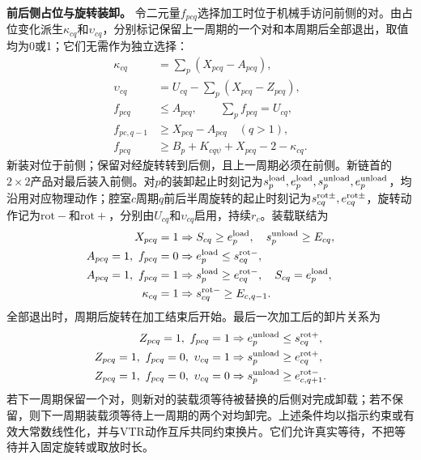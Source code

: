 \documentclass[final,5p,times,twocolumn]{elsarticle}
\begin{document}
\noindent\textbf{前后侧占位与旋转装卸。}
令二元量$f_{pcq}$选择加工时位于机械手访问前侧的对。由占位变化派生$\kappa_{cq}$和$\upsilon_{cq}$，分别标记保留上一周期的一个对和本周期后全部退出，取值均为0或1；它们无需作为独立选择：
\begin{equation}
\begin{aligned}
\kappa_{cq}&=\sum_p(X_{pcq}-A_{pcq}),\\
\upsilon_{cq}&=U_{cq}-\sum_p(X_{pcq}-Z_{pcq}),\\
f_{pcq}&\le A_{pcq},\qquad\sum_pf_{pcq}=U_{cq},\\
f_{pc,q-1}&\ge X_{pcq}-A_{pcq}\quad(q>1),\\
f_{pcq}&\ge B_p+K_{cq\psi}+X_{pcq}-2-\kappa_{cq}.
\end{aligned}
\label{eq:cycle-side-cn}
\end{equation}
新装对位于前侧；保留对经旋转转到后侧，且上一周期必须在前侧。新链首的$2\times2$产品对最后装入前侧。对$p$的装卸起止时刻记为$s_p^{\rm load},e_p^{\rm load},s_p^{\rm unload},e_p^{\rm unload}$，均沿用对应物理动作；腔室$c$周期$q$前后半周旋转的起止时刻记为$s_{cq}^{\rm rot\pm},e_{cq}^{\rm rot\pm}$，旋转动作记为$\mathrm{rot-}$和$\mathrm{rot+}$，分别由$U_{cq}$和$\upsilon_{cq}$启用，持续$r_c$。装载联结为
\begin{equation}
\begin{aligned}
X_{pcq}=1&\Rightarrow S_{cq}\ge e^{\rm load}_p,\quad
s^{\rm unload}_p\ge E_{cq},\\
A_{pcq}=1,\ f_{pcq}=0&\Rightarrow e^{\rm load}_p\le s^{\rm rot-}_{cq},\\
A_{pcq}=1,\ f_{pcq}=1&\Rightarrow s^{\rm load}_p\ge e^{\rm rot-}_{cq},\quad
S_{cq}=e^{\rm load}_p,\\
\kappa_{cq}=1&\Rightarrow s^{\rm rot-}_{cq}\ge E_{c,q-1}.
\end{aligned}
\label{eq:cycle-load-cn}
\end{equation}
全部退出时，周期后旋转在加工结束后开始。最后一次加工后的卸片关系为
\begin{equation}
\begin{aligned}
Z_{pcq}=1,\ f_{pcq}=1&\Rightarrow e^{\rm unload}_p\le s^{\rm rot+}_{cq},\\
Z_{pcq}=1,\ f_{pcq}=0,\ \upsilon_{cq}=1
&\Rightarrow s^{\rm unload}_p\ge e^{\rm rot+}_{cq},\\
Z_{pcq}=1,\ f_{pcq}=0,\ \upsilon_{cq}=0
&\Rightarrow s^{\rm unload}_p\ge e^{\rm rot-}_{c,q+1}.
\end{aligned}
\label{eq:cycle-unload-cn}
\end{equation}
若下一周期保留一个对，则新对的装载须等待被替换的后侧对完成卸载；若不保留，则下一周期装载须等待上一周期的两个对均卸完。上述条件均以指示约束或有效大常数线性化，并与VTR动作互斥共同约束换片。它们允许真实等待，不把等待并入固定旋转或取放时长。
\end{document}
